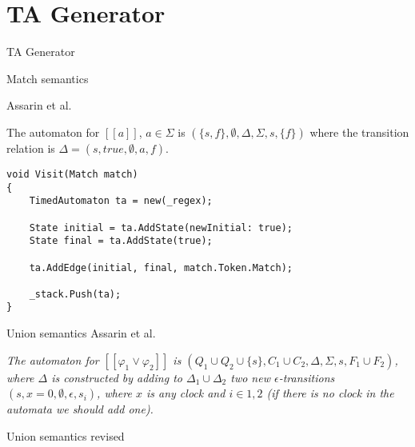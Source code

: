 
\section{TA Generator}
\begin{frame}[shrink=5]{TA Generator}
    \begin{center}
        
    \end{center}
\end{frame}
\begin{frame}[fragile]{Match semantics}
    \begin{definition}
        Assarin et al.
        
        The automaton for \underline{$[\![a]\!]$}, $a\in\Sigma$ is $(\{s,f\},\emptyset,\Delta,\Sigma,s,\{f\})$ where the transition relation is $\Delta={(s,true,\emptyset,a,f)}$.
    \end{definition}
        
    \begin{lstlisting}[style=csharp,basicstyle=\small]
void Visit(Match match)
{
    TimedAutomaton ta = new(_regex);
    
    State initial = ta.AddState(newInitial: true);
    State final = ta.AddState(true);

    ta.AddEdge(initial, final, match.Token.Match);

    _stack.Push(ta);
}
    \end{lstlisting}
\end{frame}

\begin{frame}{Union semantics}
    Assarin et al.

    \textit{The automaton for $[[\varphi_1\vee\varphi_2]]$ is $(Q_1\cup Q_2 \cup \{s\},C_1\cup C_2,\Delta,\Sigma,s,F_1\cup F_2)$, where $\Delta$ is constructed
        by adding to $\Delta_1\cup \Delta_2$ two new $\epsilon$-transitions $(s, x = 0,\emptyset,\epsilon,s_i)$, where $x$ is any clock and $i\in{1,2}$
        (if there is no clock in the automata we should add one).}

    
    
\end{frame}

\begin{frame}{Union semantics revised}
    
\end{frame}

